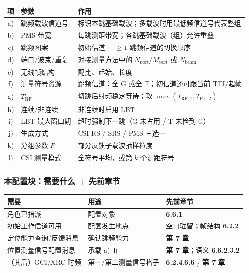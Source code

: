 \documentclass[11pt,a4paper]{ctexart}
\begin{document}
\begin{center}
\small
\begin{tabular}{|c|L{2.8cm}|L{9cm}|}
\hline
\textbf{项} & \textbf{参数} & \textbf{作用} \\
\hline
a) & 跳频载波信道号 & 标识本跳基础载波；多载波时用最低频信道号代表整组 \\
\hline
b) & PMS 带宽 & 每跳测距带宽；各跳基础载波（组）允许重叠 \\
\hline
c) & 跳频图案 & 初始信道 + $\ge 1$ 跳频信道的切换顺序 \\
\hline
d) & 端口/波束/重复 & 对接测量方法中的 $N_{\mathrm{port}}/M_{\mathrm{port}}$ 或 $N_{\mathrm{beam}}$ \\
\hline
e) & 无线帧结构 & 配比、起始、长度 \\
\hline
f) & 测量符号资源 & 跳频信道：全 G 或全 T；初信道还可跟当前 TTI/超帧 \\
\hline
g) & $T_{\mathrm{RF}}$ & 切跳后射频稳定等待；取 $\max(T_{\mathrm{RF},1},T_{\mathrm{RF},2})$ \\
\hline
h) & 连续/非连续 & 非连续时启用 LBT \\
\hline
i) & LBT 最大窗口期 & 超时强制下一跳（G 未占用 / T 未检到 G） \\
\hline
j) & 生成方式 & CSI-RS / SRS / PMS 三选一 \\
\hline
k) & 分组参数 $P$ & 部分反馈子载波抽样粒度 \\
\hline
l) & CSI 测量模式 & 全符号平均，或第 $k$ 个测距符号 \\
\hline
\end{tabular}
\end{center}

\subsubsection*{本配置块：需要什么 + 先前章节}

\begin{center}
\small
\begin{tabular}{|L{3.5cm}|L{4.5cm}|L{5cm}|}
\hline
\textbf{需要} & \textbf{用途} & \textbf{先前章节} \\
\hline
角色已指派 & 配置对象 & \textbf{6.6.1} \\
\hline
初始工作信道可用 & 配置发生地点 & 空口驻留；帧结构 \textbf{6.2.2} \\
\hline
定位能力查询/反馈消息 & 确认跳频能力 & \textbf{第 7 章} \\
\hline
位置测量信号配置消息 & 承载 a)--l) & \textbf{第 7 章}；语义 \textbf{6.6.2.3.2} \\
\hline
（其后）GCI/XRC 时频 & 第一/第二测量信号格子 & \textbf{6.2.4.6.6} / \textbf{第 7 章} \\
\hline
\end{tabular}
\end{center}
\end{document}
